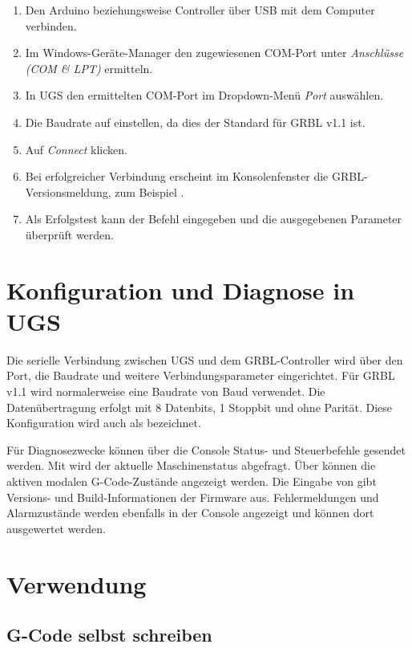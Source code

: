 \begin{enumerate}
	\item Den Arduino beziehungsweise Controller über USB mit dem Computer verbinden.
	\item Im Windows-Geräte-Manager den zugewiesenen COM-Port unter \emph{Anschlüsse (COM \& LPT)} ermitteln.
	\item In UGS den ermittelten COM-Port im Dropdown-Menü \emph{Port} auswählen.
	\item Die Baudrate auf  einstellen, da dies der Standard für GRBL v1.1 ist.
	\item Auf \emph{Connect} klicken.
	\item Bei erfolgreicher Verbindung erscheint im Konsolenfenster die GRBL-Versionsmeldung, zum Beispiel .
	\item Als Erfolgstest kann der Befehl \PYTHON{\$\$} eingegeben und die ausgegebenen Parameter überprüft werden.
\end{enumerate}

\section{Konfiguration und Diagnose in UGS}

Die serielle Verbindung zwischen UGS und dem GRBL-Controller wird über den Port, die Baudrate und weitere Verbindungsparameter eingerichtet. Für GRBL v1.1 wird normalerweise eine Baudrate von  Baud verwendet. Die Datenübertragung erfolgt mit 8 Datenbits, 1 Stoppbit und ohne Parität. Diese Konfiguration wird auch als  bezeichnet.

Für Diagnosezwecke können über die Console Status- und Steuerbefehle gesendet werden. Mit  wird der aktuelle Maschinenstatus abgefragt. Über  können die aktiven modalen G-Code-Zustände angezeigt werden. Die Eingabe von  gibt Versions- und Build-Informationen der Firmware aus. Fehlermeldungen und Alarmzustände werden ebenfalls in der Console angezeigt und können dort ausgewertet werden.

\section{Verwendung}

\subsection{G-Code selbst schreiben}

